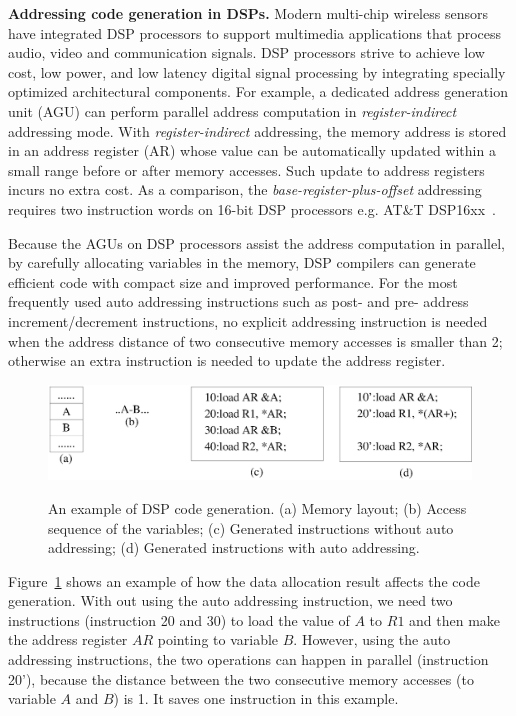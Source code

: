\textbf{Addressing code generation in DSPs.}
Modern multi-chip wireless sensors have integrated DSP processors to support multimedia applications that process 
audio, video and communication signals. DSP processors strive to achieve low cost, low power, and low latency digital 
signal processing by integrating specially optimized architectural components. For example, a dedicated address 
generation unit (AGU) can perform parallel address computation in {\em register-indirect} addressing mode. With {\em 
register-indirect} addressing, the memory address is stored in an address register (AR) whose value can be 
automatically updated within a small range before or after memory accesses. Such update to address registers incurs no 
extra cost. As a comparison, the {\em base-register-plus-offset} addressing requires two instruction words on 16-bit 
DSP processors e.g. AT\&T DSP16xx~\cite{related:dsp}. 


Because the AGUs on DSP processors assist the address computation in parallel, by carefully allocating variables in the 
memory, DSP compilers can generate efficient code with compact size and improved performance.
For the most frequently used auto addressing instructions such as post- and pre- address increment/decrement 
instructions, no explicit addressing instruction is needed when the address distance of two consecutive memory accesses 
is smaller than 2; otherwise an extra instruction is needed to update the address register.

\begin{figure}[htbp]
	\centering
		\includegraphics[scale=0.5]{figures/agu.eps}
	\label{fig:agu}
	\caption[An example of DSP code generation.]{An example of DSP code generation.
	(a) Memory layout; (b) Access sequence of the variables; (c) Generated instructions without auto addressing;
	(d) Generated instructions with auto addressing. }
\end{figure}

Figure~\ref{fig:agu} shows an example of how the data allocation result affects the code generation.
With out using the auto addressing instruction, we need two instructions (instruction 20 and 30) to load the value of 
$A$ to $R1$ and then 
make the address register $AR$ pointing to variable $B$.
However, using the auto addressing instructions, the two operations can happen in parallel (instruction 20'), because 
the distance between the two consecutive memory accesses (to variable $A$ and $B$) is 1.
It saves one instruction in this example.

